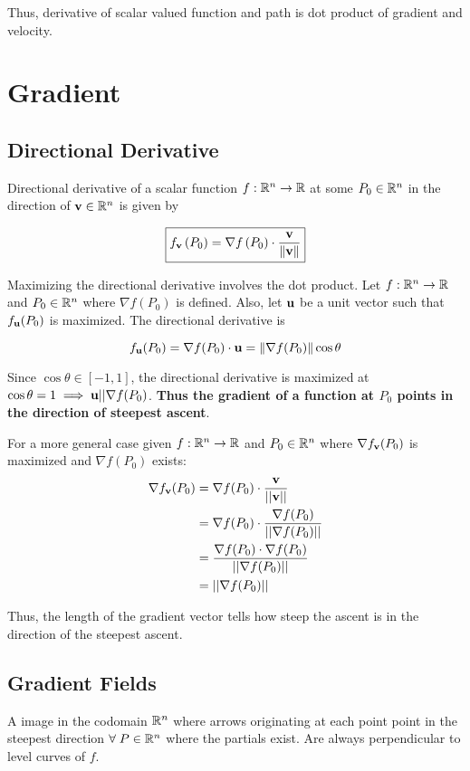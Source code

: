 Thus, derivative of scalar valued function and path is dot product of gradient and velocity.

\section{Gradient}

\subsection{Directional Derivative}

Directional derivative of a scalar function $f:\mathbb{R}^n\to \mathbb{R}$ at some $P_0\in\mathbb{R}^n$ in the direction of $\textbf{v}\in\mathbb{R}^n$ is given by

\[\boxed{f_{\textbf{v}}\left(P_{0}\right)=\nabla f\left(P_{0}\right) \cdot \frac{\textbf{v}}{\|\textbf{v}\|}}\]

Maximizing the directional derivative involves the dot product. Let $f:\mathbb{R}^n\to \mathbb{R}$ and $P_0\in\mathbb{R}^n$ where $\nabla f(P_0)$ is defined.
Also, let $\textbf{u}$ be a unit vector such that $f_{\textbf{u}}(P_0)$ is maximized. The directional derivative is

\[f_{\textbf u}(P_0)=\nabla f(P_0)\cdot \textbf u=\|\nabla f(P_0)\|\cos \theta\]

Since $\cos\theta \in [-1,1]$, the directional derivative is maximized at $\cos\theta = 1\implies \textbf{u}||\nabla f(P_0)$.
\textbf{Thus the gradient of a function at $P_0$ points in the direction of steepest ascent}.

For a more general case given $f:\mathbb{R}^n\to \mathbb{R}$ and $P_0\in\mathbb{R}^n$ where $\nabla f_{\textbf{v}}(P_0)$ is maximized and $\nabla f(P_0)$ exists:
\begin{align*}
    \nabla f_{\textbf{v}}(P_0)&=\nabla f(P_0) \cdot \frac{\textbf{v}}{||\textbf{v}||}\\
    &=\nabla f(P_0) \cdot \frac{\nabla f(P_0)}{||\nabla f(P_0)||}\\
    &=\frac{\nabla f(P_0)\cdot \nabla f(P_0)}{||\nabla f(P_0)||}\\
    &=||\nabla f(P_0)||
\end{align*}

Thus, the length of the gradient vector tells how steep the ascent is in the direction of the steepest ascent.

\subsection{Gradient Fields}

A image in the codomain $\mathbb{R}^n$ where arrows originating at each point point in the steepest direction $\forall\; P\in \mathbb{R}^n$ where the partials exist.
Are always perpendicular to level curves of $f$.

